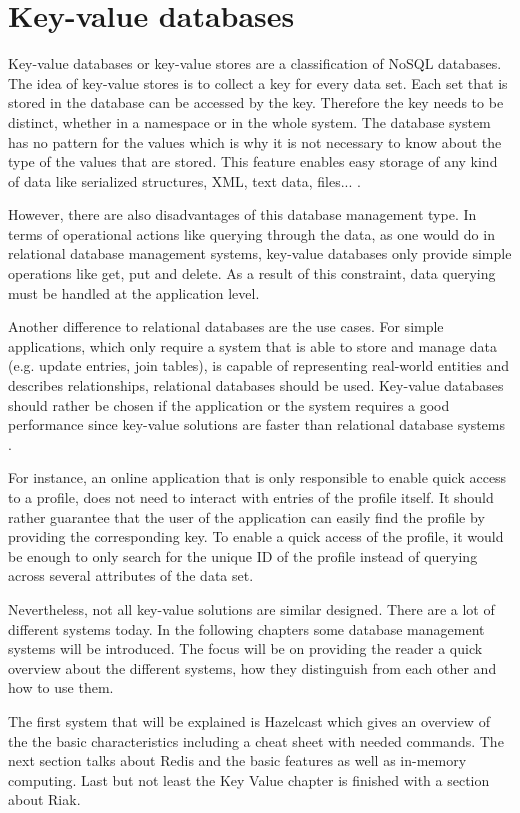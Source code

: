 \chapter{Key-value databases}
Key-value databases or key-value stores are a classification of NoSQL databases. 
The idea of key-value stores is to collect a key  for every data set. Each set that is stored in the database can be accessed by the key. Therefore the key needs to be distinct, whether in a namespace or in the whole system. The database system has no pattern for the values which is why it is not  necessary to know about the type of the values that are stored. This feature enables easy storage of any kind of data like serialized structures, XML, text data, files...  \parencite{keyValueIntro}.


However, there are also disadvantages of this database management type. In terms of operational actions like querying through the data, as one would do in relational database management systems, key-value databases only provide simple operations like get, put and delete. As a result of this constraint, data querying must be handled at the application level. 

Another difference to relational databases are the use cases. 
 For simple applications, which only require a system that is able to store and manage data (e.g. update entries, join tables), is capable of representing real-world entities and describes relationships, relational databases should be used. Key-value databases should rather be chosen if the application or the system requires a good performance since key-value solutions are faster than relational database systems \parencite{keyValueUsecase}.
 
For instance, an online application that is only responsible to enable quick access to a profile, does not need to interact with entries of the profile itself. It should rather guarantee that the user of the application can easily find the profile by providing the corresponding key. To enable a quick access of the profile, it would be enough to only search for the unique ID of the profile instead of querying across several attributes of the data set.

Nevertheless, not all key-value solutions are similar designed. There are a lot of different systems today. In the following chapters some database management systems will be introduced. The focus will be on providing the reader a quick overview about the different systems, how they distinguish from each other and how to use them.

The first system that will be explained is Hazelcast which gives an overview of the the basic characteristics including a cheat sheet with needed commands. The next section talks about Redis and the basic features as well as in-memory computing. Last but not least the Key Value chapter is finished with a section about Riak. 


